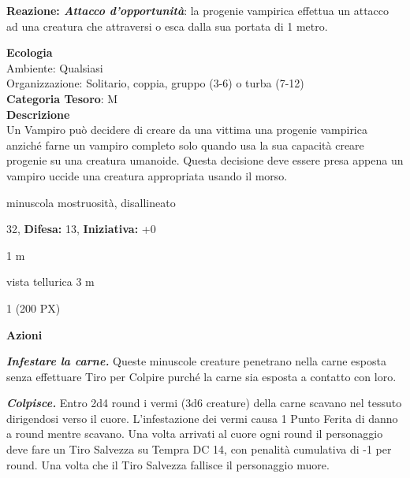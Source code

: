 \begin{multicols}{2}
{\textbf{Reazione: \emph{Attacco d'opportunità}}: la progenie vampirica effettua un attacco ad una creatura che attraversi o esca dalla sua portata di 1 metro.

\textbf{Ecologia}\\
Ambiente: Qualsiasi\\
Organizzazione: Solitario, coppia, gruppo (3-6) o turba (7-12)\\
\textbf{Categoria Tesoro}: M\\
\textbf{Descrizione}\\
Un Vampiro può decidere di creare da una vittima una progenie vampirica anziché farne un vampiro completo solo quando usa la sua capacità creare progenie su una creatura umanoide. Questa decisione deve essere presa appena un vampiro uccide una creatura appropriata usando il morso.

\noindent
\begin{description}[noitemsep, topsep=0pt, parsep=0pt, partopsep=0pt, leftmargin=0cm, labelwidth=2.2cm]
	\item[\textbf{Taglia/Tipo:}] minuscola mostruosità, disallineato
	\item[\textbf{Caratt.:}] 
	\item[\textbf{Punti Ferita:}] 32,  \textbf{Difesa:} 13,  \textbf{Iniziativa:} +0
	\item[\textbf{Movimento:}] 1 m
	\item[\textbf{Tiri Salvez.:}] 
	\item[\textbf{Sensi:}] vista tellurica 3 m
	\item[\textbf{Sfida:}] 1 (200 PX)\smallskip
\end{description}

\textbf{Azioni}

\emph{\textbf{Infestare la carne.}} Queste minuscole creature penetrano nella carne esposta senza effettuare Tiro per Colpire purché la carne sia esposta a contatto con loro.

\emph{\textbf{Colpisce.}} Entro 2d4 round i vermi (3d6 creature) della carne scavano nel tessuto dirigendosi verso il cuore. L'infestazione dei vermi causa 1 Punto Ferita di danno a round mentre scavano. Una volta arrivati al cuore ogni round il personaggio deve fare un Tiro Salvezza su Tempra DC 14, con penalità cumulativa di -1 per round. Una volta che il Tiro Salvezza fallisce il personaggio muore.

}
\end{multicols}
